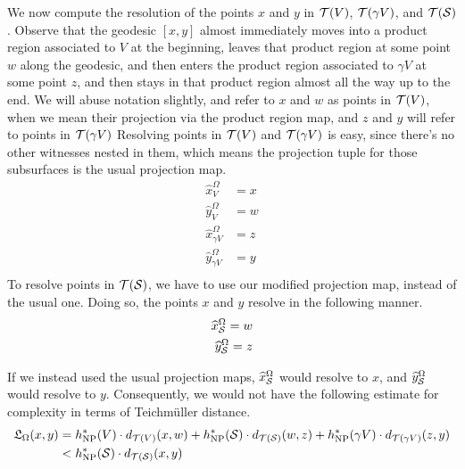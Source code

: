 \documentclass[12pt, reqno]{amsart}
\begin{document}
\begin{example}
  We now compute the resolution of the points $x$ and $y$ in $\mathcal{T}(V)$, $\mathcal{T}(\gamma V)$, and $\mathcal{T}(\mathcal{S})$.
  Observe that the geodesic $[x,y]$ almost immediately moves into a product region associated to $V$ at the beginning, leaves that product region at some point $w$ along the geodesic, and then enters the product region associated to $\gamma V$ at some point $z$, and then stays in that product region almost all the way up to the end.
  We will abuse notation slightly, and refer to $x$ and $w$ as points in $\mathcal{T}(V)$, when we mean their projection via the product region map, and $z$ and $y$ will refer to points in $\mathcal{T}(\gamma V)$
  Resolving points in $\mathcal{T}(V)$ and $\mathcal{T}(\gamma V)$ is easy, since there's no other witnesses nested in them, which means the projection tuple for those subsurfaces is the usual projection map.
  \begin{align*}
    \widehat{x}_V^{\Omega} &= x \\
    \widehat{y}_V^{\Omega} &= w \\
    \widehat{x}_{\gamma V}^{\Omega} &= z \\
    \widehat{y}_{\gamma V}^{\Omega} &= y \\
  \end{align*}
  To resolve points in $\mathcal{T}(\mathcal{S})$, we have to use our modified projection map, instead of the usual one.
  Doing so, the points $x$ and $y$ resolve in the following manner.
  \begin{align*}
    \widehat{x}_{\mathcal{S}}^{\Omega} = w \\
    \widehat{y}_{\mathcal{S}}^{\Omega} = z
  \end{align*}

  If we instead used the usual projection maps, $\widehat{x}_{\mathcal{S}}^{\Omega}$ would resolve to $x$, and $\widehat{y}_{\mathcal{S}}^{\Omega}$ would resolve to $y$.
  Consequently, we would not have the following estimate for complexity in terms of Teichmüller distance.
  \begin{align*}
    \mathfrak{L}_{\Omega}(x,y) &= h_{\mathrm{NP}}^{\ast}(V) \cdot d_{\mathcal{T}(V)}(x, w) + h_{\mathrm{NP}}^{\ast}(\mathcal{S}) \cdot d_{\mathcal{T}(\mathcal{S})}(w, z) + h_{\mathrm{NP}}^{\ast}(\gamma V) \cdot d_{\mathcal{T}(\gamma V)}(z, y) \\
    &< h_{\mathrm{NP}}^{\ast}(\mathcal{S}) \cdot d_{\mathcal{T}(\mathcal{S})}(x, y)
  \end{align*}
\end{example}
\end{document}
